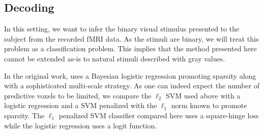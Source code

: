 \documentclass{frontiersSCNS} %
\begin{document}
\subsection{Decoding}

In this setting, we want to infer the binary visual stimulus presented to
the subject from the recorded fMRI data.
As the stimuli are binary, we will treat this problem as a classification
problem. This implies that the method presented here cannot be extended as-is to
natural stimuli described with gray values. 

In the original work, \cite{miyawaki2008} uses a Bayesian logistic regression
promoting sparsity along with a sophisticated multi-scale strategy.
As one can indeed expect the number of predictive voxels to be limited, we 
compare the $\ell_2$ SVM used above with
a logistic regression and a SVM
penalized with the $\ell_1$ norm
known to promote sparsity. The $\ell_1$ penalized SVM classifier compared here
uses a square-hinge loss while the logistic regression uses a logit function.

\end{document}
